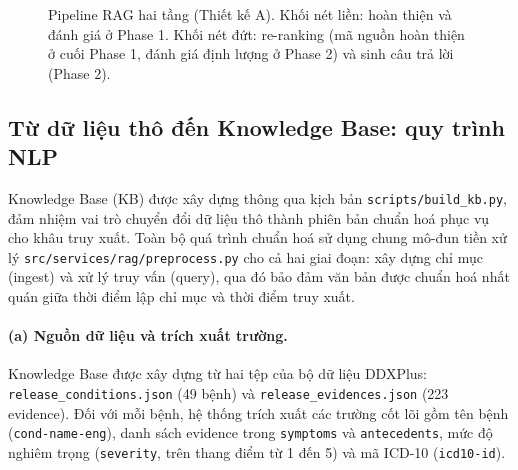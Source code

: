 \begin{figure}[H]
    \centering
    \caption{Pipeline RAG hai tầng (Thiết kế A). Khối nét liền: hoàn thiện và đánh giá ở Phase 1. Khối nét đứt: re-ranking (mã nguồn hoàn thiện ở cuối Phase 1, đánh giá định lượng ở Phase 2) và sinh câu trả lời (Phase 2).}
    \label{fig:pipeline}
\end{figure}

\subsection{Từ dữ liệu thô đến Knowledge Base: quy trình NLP}

Knowledge Base (KB) được xây dựng thông qua kịch bản \texttt{scripts/build\_kb.py}, đảm nhiệm vai trò chuyển đổi dữ liệu thô thành phiên bản chuẩn hoá phục vụ cho khâu truy xuất. Toàn bộ quá trình chuẩn hoá sử dụng chung mô-đun tiền xử lý \texttt{src/services/rag/preprocess.py} cho cả hai giai đoạn: xây dựng chỉ mục (ingest) và xử lý truy vấn (query), qua đó bảo đảm văn bản được chuẩn hoá nhất quán giữa thời điểm lập chỉ mục và thời điểm truy xuất.

\paragraph{(a) Nguồn dữ liệu và trích xuất trường.}
Knowledge Base được xây dựng từ hai tệp của bộ dữ liệu DDXPlus: \texttt{release\_conditions.json} (49 bệnh) và \texttt{release\_evidences.json} (223 evidence). Đối với mỗi bệnh, hệ thống trích xuất các trường cốt lõi gồm tên bệnh (\texttt{cond-name-eng}), danh sách evidence trong \texttt{symptoms} và \texttt{antecedents}, mức độ nghiêm trọng (\texttt{severity}, trên thang điểm từ 1 đến 5) và mã ICD-10 (\texttt{icd10-id}).

